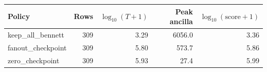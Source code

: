 \begin{tabular}{lrrrr}
\toprule
Policy & Rows & $\log_{10}(T+1)$ & Peak ancilla & $\log_{10}(\mathrm{score}+1)$ \\
\midrule
keep\_all\_bennett & 309 & 3.29 & 6056.0 & 3.36 \\
fanout\_checkpoint & 309 & 5.80 & 573.7 & 5.86 \\
zero\_checkpoint & 309 & 5.93 & 27.4 & 5.99 \\
\bottomrule
\end{tabular}
